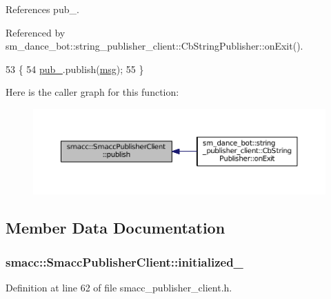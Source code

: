 References pub\+\_\+.



Referenced by sm\+\_\+dance\+\_\+bot\+::string\+\_\+publisher\+\_\+client\+::\+Cb\+String\+Publisher\+::on\+Exit().


\begin{DoxyCode}
53   \{
54     \hyperlink{classsmacc_1_1SmaccPublisherClient_a674fc5715c4983d093c8ae387232ae55}{pub\_}.publish(\hyperlink{namespacekeyboard__node_a768777e12f75b89e4a0a60acf748e9eb}{msg});
55   \}
\end{DoxyCode}


Here is the caller graph for this function\+:
\nopagebreak
\begin{figure}[H]
\begin{center}
\leavevmode
\includegraphics[width=350pt]{classsmacc_1_1SmaccPublisherClient_ab82b8234c5bbedf393b70cff442bd5be_icgraph}
\end{center}
\end{figure}




\subsection{Member Data Documentation}
\subsubsection[{\texorpdfstring{initialized\+\_\+}{initialized_}}]{ smacc\+::\+Smacc\+Publisher\+Client\+::initialized\+\_\+\hspace{0.3cm}{\ttfamily [private]}}\hypertarget{classsmacc_1_1SmaccPublisherClient_affbfbaa739a6de9f118c551c56b09dfe}{}\label{classsmacc_1_1SmaccPublisherClient_affbfbaa739a6de9f118c551c56b09dfe}


Definition at line 62 of file smacc\+\_\+publisher\+\_\+client.\+h.



